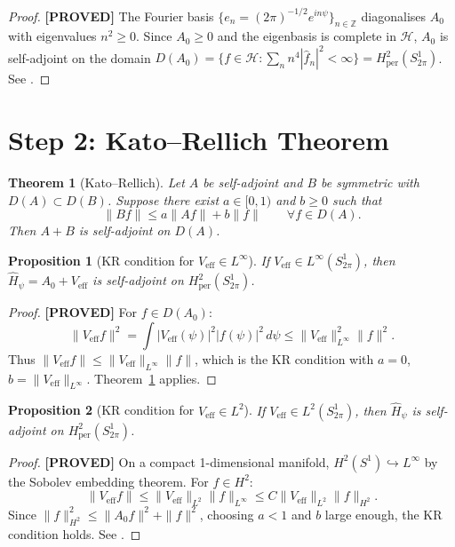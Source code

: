 \documentclass[11pt,a4paper]{article}
\newtheorem{theorem}{Theorem}
\newtheorem{proposition}{Proposition}
\newcommand{\proved}[1]{\textbf{[PROVED]} #1}
\begin{document}
\begin{proof}
  \proved{} The Fourier basis $\{e_n = (2\pi)^{-1/2} e^{in\psi}\}_{n\in\mathbb{Z}}$
  diagonalises $A_0$ with eigenvalues $n^2 \geq 0$.  Since $A_0 \geq 0$ and the
  eigenbasis is complete in $\mathscr{H}$, $A_0$ is self-adjoint on the domain
  $D(A_0) = \{f \in \mathscr{H} : \sum_n n^4 |\hat{f}_n|^2 < \infty\}
  = H^2_\mathrm{per}(S^1_{2\pi})$.  See \cite[Thm.\ VIII.6]{ReedSimon1}.
\end{proof}

\section{Step 2: Kato--Rellich Theorem}

\begin{theorem}[Kato--Rellich]
  \label{thm:KR}
  Let $A$ be self-adjoint and $B$ be symmetric with $D(A) \subset D(B)$.
  Suppose there exist $a \in [0,1)$ and $b \geq 0$ such that
  \[
    \|Bf\| \leq a\|Af\| + b\|f\| \qquad \forall f \in D(A).
  \]
  Then $A + B$ is self-adjoint on $D(A)$.
\end{theorem}

\begin{proposition}[KR condition for $V_\mathrm{eff} \in L^\infty$]
  \label{prop:Linf}
  If $V_\mathrm{eff} \in L^\infty(S^1_{2\pi})$, then $\hat{H}_\psi = A_0 + V_\mathrm{eff}$
  is self-adjoint on $H^2_\mathrm{per}(S^1_{2\pi})$.
\end{proposition}

\begin{proof}
  \proved{} For $f \in D(A_0)$:
  \[
    \|V_\mathrm{eff} f\|^2 = \int |V_\mathrm{eff}(\psi)|^2 |f(\psi)|^2\, d\psi
    \leq \|V_\mathrm{eff}\|_{L^\infty}^2 \|f\|^2.
  \]
  Thus $\|V_\mathrm{eff} f\| \leq \|V_\mathrm{eff}\|_{L^\infty}\|f\|$, which
  is the KR condition with $a = 0$, $b = \|V_\mathrm{eff}\|_{L^\infty}$.
  Theorem~\ref{thm:KR} applies.
\end{proof}

\begin{proposition}[KR condition for $V_\mathrm{eff} \in L^2$]
  \label{prop:L2}
  If $V_\mathrm{eff} \in L^2(S^1_{2\pi})$, then $\hat{H}_\psi$ is self-adjoint
  on $H^2_\mathrm{per}(S^1_{2\pi})$.
\end{proposition}

\begin{proof}
  \proved{} On a compact 1-dimensional manifold, $H^2(S^1) \hookrightarrow L^\infty$
  by the Sobolev embedding theorem.  For $f \in H^2$:
  \[
    \|V_\mathrm{eff} f\| \leq \|V_\mathrm{eff}\|_{L^2}\|f\|_{L^\infty}
    \leq C \|V_\mathrm{eff}\|_{L^2}\|f\|_{H^2}.
  \]
  Since $\|f\|_{H^2}^2 \leq \|A_0 f\|^2 + \|f\|^2$, choosing $a < 1$ and $b$
  large enough, the KR condition holds.  See \cite[Thm.\ X.12]{ReedSimon2}.
\end{proof}
\end{document}
